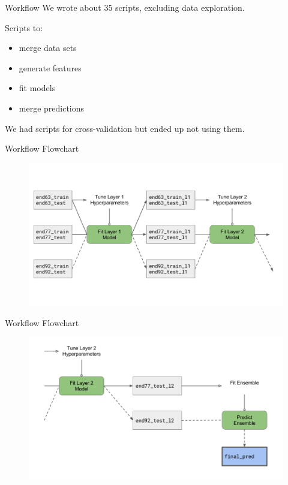 \documentclass{beamer}
\begin{document}
\begin{frame}{Workflow}
  We wrote about 35 scripts, excluding data exploration.
  \begin{block}{Scripts to:}
    \begin{itemize}
      \item merge data sets
      \item generate features
      \item fit models
      \item merge predictions
    \end{itemize}
  \end{block}
  We had scripts for cross-validation but ended up not using them.
\end{frame}

\begin{frame}{Workflow Flowchart}
  \begin{figure}
	  \centering\includegraphics[scale=0.32]{graphics/data_flow_1.png}
  \end{figure}
\end{frame}

\begin{frame}{Workflow Flowchart}
  \begin{figure}
	  \centering\includegraphics[scale=0.32]{graphics/data_flow_2.png}
  \end{figure}
\end{frame}
\end{document}
